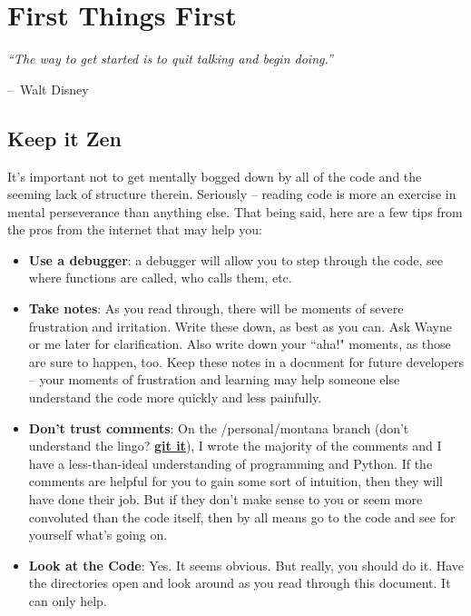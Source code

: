 \documentclass{report}
\makeatletter
\newenvironment{chapquote}[2][2em]
  {\setlength{\@tempdima}{#1}%
   \def\chapquote@author{#2}%
   \parshape 1 \@tempdima \dimexpr\textwidth-2\@tempdima\relax%
   \itshape}
  {\par\normalfont\hfill--\ \chapquote@author\hspace*{\@tempdima}\par\bigskip}
\makeatother
\begin{document}
\chapter{First Things First}
\begin{chapquote}{Walt Disney \textit{}}
``The way to get started is to quit talking and begin doing.''
\end{chapquote}

\section{Keep it Zen}
It's important not to get mentally bogged down by all of the code and the seeming lack of structure therein. Seriously -- reading code is more an exercise in mental perseverance than anything else. That being said, here are a few tips from the pros from the internet that may help you:
	\begin{itemize}
	\item \textbf{Use a debugger}: a debugger will allow you to step through the code, see where functions are called, who calls them, etc.
	\item \textbf{Take notes}: As you read through, there will be moments of severe frustration and irritation. Write these down, as best as you can. Ask Wayne or me later for clarification. Also write down your ``aha!" moments, as those are sure to happen, too. Keep these notes in a document for future developers -- your moments of frustration and learning may help someone else understand the code more quickly and less painfully.
	\item \textbf{Don't trust comments}: On the /personal/montana branch (don't understand the lingo? \hyperref[app:git]{\textbf{git it}}), I wrote the majority of the comments and I have a less-than-ideal understanding of programming and Python. If the comments are helpful for you to gain some sort of intuition, then they will have done their job. But if they don't make sense to you or seem more convoluted than the code itself, then by all means go to the code and see for yourself what's going on.
	\item \textbf{Look at the Code}: Yes. It seems obvious. But really, you should do it. Have the directories open and look around as you read through this document. It can only help.
	\end{itemize}
	
\end{document}

